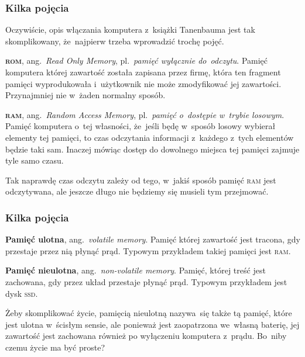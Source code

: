 \documentclass[10pt,t]{beamer}
\begin{document}
\begin{frame}
  \frametitle{Kilka pojęcia}


  Oczywiście, opis włączania komputera z~książki Tanenbauma jest tak
  skomplikowany, że~najpierw trzeba wprowadzić trochę pojęć.

  \textbf{\textsc{rom}}, ang.~\textit{Read Only Memory}, pl.~\textit{pamięć
    wyłącznie do~odczytu}. Pamięć komputera której zawartość została
  zapisana przez firmę, która ten fragment pamięci wyprodukowała
  i~użytkownik nie może zmodyfikować jej zawartości. Przynajmniej nie
  w~żaden normalny sposób.

  \textbf{\textsc{ram}}, ang.~\textit{Random Access Memory},
  pl.~\textit{pamięć o~dostępie w~trybie losowym}. Pamięć komputera o~tej
  własności, że~jeśli będę w~sposób losowy wybierał elementy tej pamięci,
  to czas odczytania informacji z~każdego z~tych elementów będzie taki sam.
  Inaczej mówiąc dostęp do dowolnego miejsca tej pamięci zajmuje tyle samo
  czasu.

  Tak naprawdę czas odczytu zależy od tego, w~jakiś sposób pamięć
  \textsc{ram} jest odczytywana, ale jeszcze długo nie będziemy się musieli
  tym przejmować.

\end{frame}





\begin{frame}
  \frametitle{Kilka pojęcia}


  \textbf{Pamięć ulotna}, ang.~\textit{volatile memory}. Pamięć której
  zawartość jest tracona, gdy przestaje przez nią płynąć prąd. Typowym
  przykładem takiej pamięci jest \textsc{ram}.

  \textbf{Pamięć nieulotna}, ang.~\textit{non-volatile memory}. Pamięć,
  której treść jest zachowana, gdy przez układ przestaje płynąć prąd.
  Typowym przykładem jest dysk \textsc{ssd}.

  Żeby skomplikować życie, pamięcią nieulotną nazywa~się także tą pamięć,
  które jest ulotna w~ścisłym sensie, ale ponieważ jest zaopatrzona
  we~własną baterię, jej zawartość jest zachowana również po wyłączeniu
  komputera z~prądu. Bo~niby czemu życie ma być proste?

\end{frame}
\end{document}
